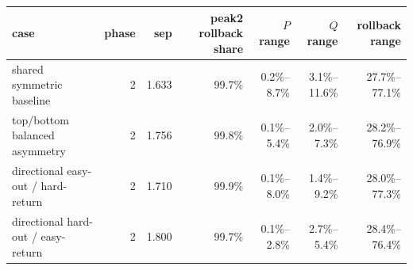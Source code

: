 \begin{tabular}{lrrrrrr}
\toprule
case & phase & sep & peak2 rollback share & $P$ range & $Q$ range & rollback range \\
\midrule
shared symmetric baseline & 2 & 1.633 & 99.7\% & 0.2\%--8.7\% & 3.1\%--11.6\% & 27.7\%--77.1\% \\
top/bottom balanced asymmetry & 2 & 1.756 & 99.8\% & 0.1\%--5.4\% & 2.0\%--7.3\% & 28.2\%--76.9\% \\
directional easy-out / hard-return & 2 & 1.710 & 99.9\% & 0.1\%--8.0\% & 1.4\%--9.2\% & 28.0\%--77.3\% \\
directional hard-out / easy-return & 2 & 1.800 & 99.7\% & 0.1\%--2.8\% & 2.7\%--5.4\% & 28.4\%--76.4\% \\
\bottomrule
\end{tabular}
